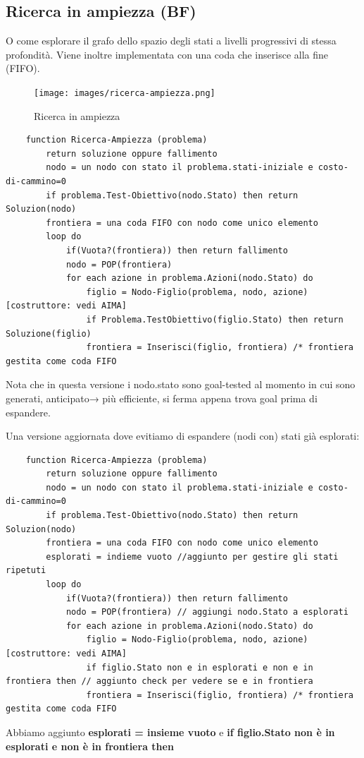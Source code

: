 \newpage
\subsection{Ricerca in ampiezza (BF)}
O come esplorare il grafo dello spazio degli stati a livelli progressivi di stessa profondità. Viene inoltre
implementata con una coda che inserisce alla fine (FIFO).
\begin{figure}[h!]
	\centering
	\texttt{[image: images/ricerca-ampiezza.png]}
	\caption{Ricerca in ampiezza}
\end{figure}
\begin{lstlisting}
	function Ricerca-Ampiezza (problema)
		return soluzione oppure fallimento
		nodo = un nodo con stato il problema.stati-iniziale e costo-di-cammino=0
		if problema.Test-Obiettivo(nodo.Stato) then return Soluzion(nodo)
		frontiera = una coda FIFO con nodo come unico elemento
		loop do
			if(Vuota?(frontiera)) then return fallimento
			nodo = POP(frontiera)
			for each azione in problema.Azioni(nodo.Stato) do
				figlio = Nodo-Figlio(problema, nodo, azione) [costruttore: vedi AIMA]
				if Problema.TestObiettivo(figlio.Stato) then return Soluzione(figlio)
				frontiera = Inserisci(figlio, frontiera) /* frontiera gestita come coda FIFO
\end{lstlisting}
\begin{note}
	Nota che in questa versione i nodo.stato sono goal-tested al momento in cui sono generati, anticipato→ più efficiente, si ferma appena trova goal prima di espandere.
\end{note}
Una versione aggiornata dove evitiamo di espandere (nodi con) stati già esplorati:
\begin{lstlisting}
	function Ricerca-Ampiezza (problema)
		return soluzione oppure fallimento
		nodo = un nodo con stato il problema.stati-iniziale e costo-di-cammino=0
		if problema.Test-Obiettivo(nodo.Stato) then return Soluzion(nodo)
		frontiera = una coda FIFO con nodo come unico elemento
		esplorati = indieme vuoto //aggiunto per gestire gli stati ripetuti
		loop do
			if(Vuota?(frontiera)) then return fallimento
			nodo = POP(frontiera) // aggiungi nodo.Stato a esplorati
			for each azione in problema.Azioni(nodo.Stato) do
				figlio = Nodo-Figlio(problema, nodo, azione) [costruttore: vedi AIMA]
				if figlio.Stato non e in esplorati e non e in frontiera then // aggiunto check per vedere se e in frontiera
				frontiera = Inserisci(figlio, frontiera) /* frontiera gestita come coda FIFO
\end{lstlisting}
Abbiamo aggiunto \textbf{esplorati = insieme vuoto} e \textbf{if figlio.Stato non è in esplorati e non è in frontiera then} 
